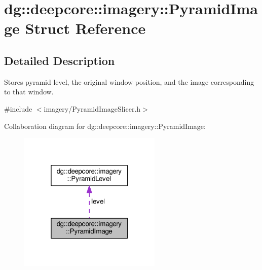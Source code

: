 \hypertarget{structdg_1_1deepcore_1_1imagery_1_1_pyramid_image}{}\section{dg\+:\+:deepcore\+:\+:imagery\+:\+:Pyramid\+Image Struct Reference}
\label{structdg_1_1deepcore_1_1imagery_1_1_pyramid_image}


\subsection{Detailed Description}
Stores pyramid level, the original window position, and the image corresponding to that window. 

{\ttfamily \#include $<$imagery/\+Pyramid\+Image\+Slicer.\+h$>$}



Collaboration diagram for dg\+:\+:deepcore\+:\+:imagery\+:\+:Pyramid\+Image\+:
\nopagebreak
\begin{figure}[H]
\begin{center}
\leavevmode
\includegraphics[width=193pt]{structdg_1_1deepcore_1_1imagery_1_1_pyramid_image__coll__graph}
\end{center}
\end{figure}
